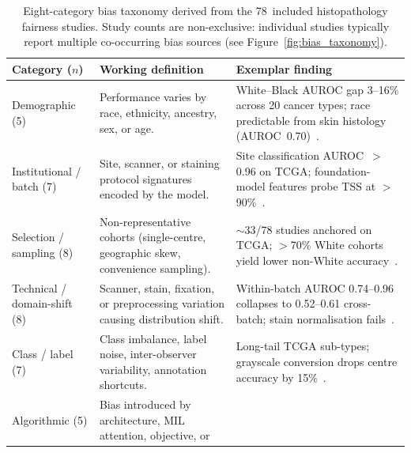 \begin{table}[htbp]
  \centering
  \caption{Eight-category bias taxonomy derived from the 78~included
           histopathology fairness studies. Study counts are
           non-exclusive: individual studies typically report multiple
           co-occurring bias sources (see
           Figure~\ref{fig:bias_taxonomy}).}
  \label{tab:bias_taxonomy}
  \small
  \begin{tabularx}{\linewidth}{@{}p{2.3cm} X X@{}}
    \toprule
    \textbf{Category ($n$)} & \textbf{Working definition} &
      \textbf{Exemplar finding} \\
    \midrule
    Demographic (5) &
      Performance varies by race, ethnicity, ancestry, sex, or age. &
      White--Black AUROC gap 3--16\% across 20 cancer types;
      race predictable from skin histology (AUROC~0.70)~\citep{vaidya2024demographic,
      chen2025predicting, lin2025contrastive, huang2025knowledge}. \\
    \addlinespace[2pt]
    Institutional / batch (7) &
      Site, scanner, or staining protocol signatures encoded by
      the model. &
      Site classification AUROC~$>$0.96 on TCGA; foundation-model
      features probe TSS at $>$90\%~\citep{howard2021site,
      dehkharghanian2023biased, komen2024batch, kheiri2025investigation}. \\
    \addlinespace[2pt]
    Selection / sampling (8) &
      Non-representative cohorts (single-centre, geographic skew,
      convenience sampling). &
      $\sim$33/78 studies anchored on TCGA; $>$70\% White cohorts
      yield lower non-White accuracy~\citep{soltan2024challenges,
      celi2022sources, musa2026cross, tasci2022bias}. \\
    \addlinespace[2pt]
    Technical / domain-shift (8) &
      Scanner, stain, fixation, or preprocessing variation causing
      distribution shift. &
      Within-batch AUROC 0.74--0.96 collapses to 0.52--0.61 cross-batch;
      stain normalisation fails~\citep{lin2025stain, komen2024batch,
      aubreville2022mitosis, roschewitz2023automatic}. \\
    \addlinespace[2pt]
    Class / label (7) &
      Class imbalance, label noise, inter-observer variability,
      annotation shortcuts. &
      Long-tail TCGA sub-types; grayscale conversion drops centre
      accuracy by 15\%~\citep{tasci2022bias, hagele2020resolving,
      kheiri2025investigation, vanbooven2025mitigating}. \\
    \addlinespace[2pt]
    Algorithmic (5) &
      Bias introduced by architecture, MIL attention, objective, or

\end{tabularx}
\end{table}
